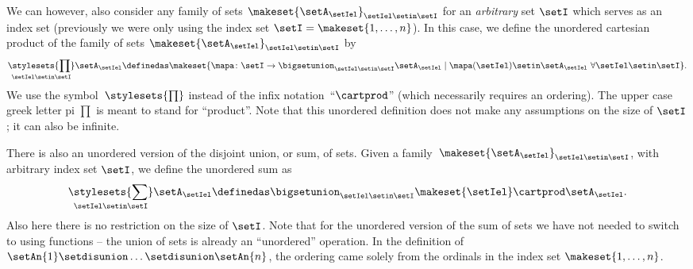 We can however, also consider any family of sets $\makeset{ \setA_\setIel }_{\setIel \setin\setI}$ for an \emph{arbitrary} set $\setI$ which serves as an index set (previously we were only using the index set $\setI = \makeset{1, \dots, n}$).
In this case, we define the unordered cartesian product of the family of sets $\makeset{ \setA_\setIel }_{\setIel \setin\setI}$ by
\begin{equation}
    \underset{\setIel \setin\setI}{\stylesets{\prod}} \setA_{\setIel} \definedas \makeset{ \mapa \colon \setI \to \bigsetunion_{\setIel \setin\setI } \setA_{\setIel} \mid \mapa(\setIel) \setin\setA_{\setIel} \ \forall \setIel \setin\setI}.
\end{equation}
We use the symbol~$\stylesets{\prod}$ instead of the infix notation~``$\cartprod$'' (which necessarily requires an ordering).
The upper case greek letter pi $\prod$ is meant to stand for ``product''.
Note that this unordered definition does not make any assumptions on the size of $\setI$; it can also be infinite.

There is also an unordered version of the disjoint union, or sum, of sets.
Given a family~$\makeset{ \setA_{\setIel} }_{\setIel \setin\setI}$, with arbitrary index set $\setI$, we define the unordered sum as
\begin{equation}
    \underset{\setIel \setin\setI}{\stylesets{\sum}} \setA_{\setIel} \definedas \bigsetunion_{\setIel \setin\setI} \makeset{ \setIel } \cartprod \setA_{\setIel}.
\end{equation}
Also here there is no restriction on the size of $\setI$.
Note that for the unordered version of the sum of sets we have not needed to switch to using functions -- the union of sets is already an ``unordered'' operation.
In the definition of $\setAn{1} \setdisunion \dots \setdisunion \setAn{n}$, the ordering came solely from the ordinals in the index set $\makeset{1, \dots, n}$.

